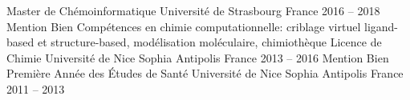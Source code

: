 
\begin{cventries}

  \cventryvar
    {Master de Chémoinformatique}
    {Université de Strasbourg}
    {France}
    {2016 -- 2018}
    {
      \vspace{-1.2\baselineskip}Mention Bien
      \newline
      Compétences en chimie computationnelle: criblage virtuel ligand-based et structure-based, modélisation moléculaire, chimiothèque
    }
  \vspace{.5em}
  \cventryvar
    {Licence de Chimie}
    {Université de Nice Sophia Antipolis}
    {France}
    {2013 -- 2016}
    {\vspace{-1.2\baselineskip}Mention Bien}
  \vspace{.5em}
  \cventryvar
    {Première Année des Études de Santé}
    {Université de Nice Sophia Antipolis}
    {France}
    {2011 -- 2013}
    {}
  

\end{cventries}
